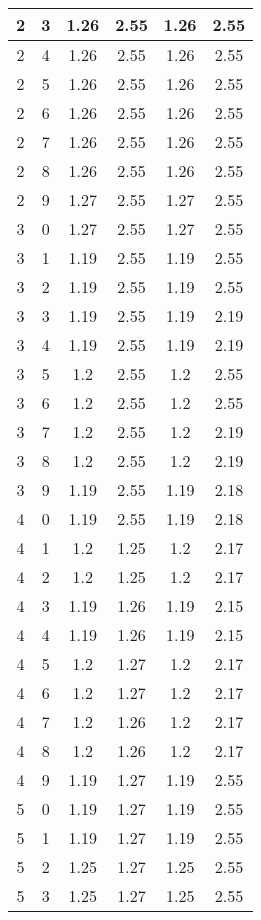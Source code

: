 \begin{longtable}{|c|c||c||c||c|c|}
	2 & 3 & 1.26 & 2.55 & 1.26 & 2.55 \\ \hline
	2 & 4 & 1.26 & 2.55 & 1.26 & 2.55 \\ \hline
	2 & 5 & 1.26 & 2.55 & 1.26 & 2.55 \\ \hline
	2 & 6 & 1.26 & 2.55 & 1.26 & 2.55 \\ \hline
	2 & 7 & 1.26 & 2.55 & 1.26 & 2.55 \\ \hline
	2 & 8 & 1.26 & 2.55 & 1.26 & 2.55 \\ \hline
	2 & 9 & 1.27 & 2.55 & 1.27 & 2.55 \\ \hline
	3 & 0 & 1.27 & 2.55 & 1.27 & 2.55 \\ \hline
	3 & 1 & 1.19 & 2.55 & 1.19 & 2.55 \\ \hline
	3 & 2 & 1.19 & 2.55 & 1.19 & 2.55 \\ \hline
	3 & 3 & 1.19 & 2.55 & 1.19 & 2.19 \\ \hline
	3 & 4 & 1.19 & 2.55 & 1.19 & 2.19 \\ \hline
	3 & 5 & 1.2 & 2.55 & 1.2 & 2.55 \\ \hline
	3 & 6 & 1.2 & 2.55 & 1.2 & 2.55 \\ \hline
	3 & 7 & 1.2 & 2.55 & 1.2 & 2.19 \\ \hline
	3 & 8 & 1.2 & 2.55 & 1.2 & 2.19 \\ \hline
	3 & 9 & 1.19 & 2.55 & 1.19 & 2.18 \\ \hline
	4 & 0 & 1.19 & 2.55 & 1.19 & 2.18 \\ \hline
	4 & 1 & 1.2 & 1.25 & 1.2 & 2.17 \\ \hline
	4 & 2 & 1.2 & 1.25 & 1.2 & 2.17 \\ \hline
	4 & 3 & 1.19 & 1.26 & 1.19 & 2.15 \\ \hline
	4 & 4 & 1.19 & 1.26 & 1.19 & 2.15 \\ \hline
	4 & 5 & 1.2 & 1.27 & 1.2 & 2.17 \\ \hline
	4 & 6 & 1.2 & 1.27 & 1.2 & 2.17 \\ \hline
	4 & 7 & 1.2 & 1.26 & 1.2 & 2.17 \\ \hline
	4 & 8 & 1.2 & 1.26 & 1.2 & 2.17 \\ \hline
	4 & 9 & 1.19 & 1.27 & 1.19 & 2.55 \\ \hline
	5 & 0 & 1.19 & 1.27 & 1.19 & 2.55 \\ \hline
	5 & 1 & 1.19 & 1.27 & 1.19 & 2.55 \\ \hline
	5 & 2 & 1.25 & 1.27 & 1.25 & 2.55 \\ \hline
	5 & 3 & 1.25 & 1.27 & 1.25 & 2.55 \\ \hline

\end{longtable}
